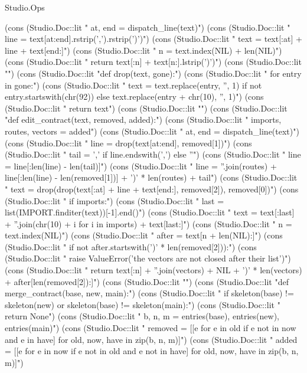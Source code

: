 \begin{lexlean}{Studio.Ops}
\begin{semanticmodule}
    (cons (Studio.Doc::lit "    at, end = dispatch_line(text)\n")
    (cons (Studio.Doc::lit "    line = text[at:end].rstrip(',').rstrip(')')\n")
    (cons (Studio.Doc::lit "    text = text[:at] + line + text[end:]\n")
    (cons (Studio.Doc::lit "    n = text.index(NIL) + len(NIL)\n")
    (cons (Studio.Doc::lit "    return text[:n] + text[n:].lstrip(')')\n")
    (cons (Studio.Doc::lit "\n")
    (cons (Studio.Doc::lit "def drop(text, gone):\n")
    (cons (Studio.Doc::lit "    for entry in gone:\n")
    (cons (Studio.Doc::lit "        text = text.replace(entry, '', 1) if not entry.startswith(chr(92)) else text.replace(entry + chr(10), '', 1)\n")
    (cons (Studio.Doc::lit "    return text\n")
    (cons (Studio.Doc::lit "\n")
    (cons (Studio.Doc::lit "def edit_contract(text, removed, added):\n")
    (cons (Studio.Doc::lit "    imports, routes, vectors = added\n")
    (cons (Studio.Doc::lit "    at, end = dispatch_line(text)\n")
    (cons (Studio.Doc::lit "    line = drop(text[at:end], removed[1])\n")
    (cons (Studio.Doc::lit "    tail = ',' if line.endswith(',') else ''\n")
    (cons (Studio.Doc::lit "    line = line[:len(line) - len(tail)]\n")
    (cons (Studio.Doc::lit "    line = ''.join(routes) + line[:len(line) - len(removed[1])] + ')' * len(routes) + tail\n")
    (cons (Studio.Doc::lit "    text = drop(drop(text[:at] + line + text[end:], removed[2]), removed[0])\n")
    (cons (Studio.Doc::lit "    if imports:\n")
    (cons (Studio.Doc::lit "        last = list(IMPORT.finditer(text))[-1].end()\n")
    (cons (Studio.Doc::lit "        text = text[:last] + ''.join(chr(10) + i for i in imports) + text[last:]\n")
    (cons (Studio.Doc::lit "    n = text.index(NIL)\n")
    (cons (Studio.Doc::lit "    after = text[n + len(NIL):]\n")
    (cons (Studio.Doc::lit "    if not after.startswith(')' * len(removed[2])):\n")
    (cons (Studio.Doc::lit "        raise ValueError('the vectors are not closed after their list')\n")
    (cons (Studio.Doc::lit "    return text[:n] + ''.join(vectors) + NIL + ')' * len(vectors) + after[len(removed[2]):]\n")
    (cons (Studio.Doc::lit "\n")
    (cons (Studio.Doc::lit "def merge_contract(base, new, main):\n")
    (cons (Studio.Doc::lit "    if skeleton(base) != skeleton(new) or skeleton(base) != skeleton(main):\n")
    (cons (Studio.Doc::lit "        return None\n")
    (cons (Studio.Doc::lit "    b, n, m = entries(base), entries(new), entries(main)\n")
    (cons (Studio.Doc::lit "    removed = [[e for e in old if e not in now and e in have] for old, now, have in zip(b, n, m)]\n")
    (cons (Studio.Doc::lit "    added = [[e for e in now if e not in old and e not in have] for old, now, have in zip(b, n, m)]\n")

\end{semanticmodule}
\end{lexlean}
